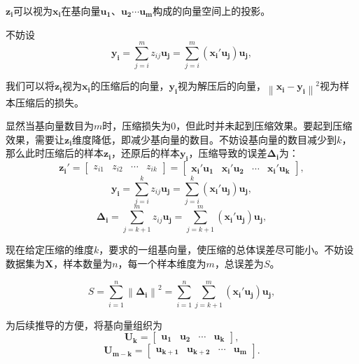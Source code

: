 \documentclass[withoutpreface,bwprint]{cumcmthesis}
\begin{document}
$\boldsymbol{z_{i}}$可以视为$\boldsymbol{x_{i}}$在基向量$\boldsymbol{u_{1}}$、$\boldsymbol{u_{2}}\cdots\boldsymbol{u_{m}}$构成的向量空间上的投影。

不妨设
\begin{equation*}
\boldsymbol{y_{i}}=\sum_{j=i}^{m}z_{ij}\boldsymbol{u_{j}}=\sum_{j=i}^{m}(\boldsymbol{x_{i}'u_{j}})\boldsymbol{u_{j}},
\end{equation*}

我们可以将$\boldsymbol{z_{i}}$视为$\boldsymbol{x_{i}}$的压缩后的向量，$\boldsymbol{y_{i}}$视为解压后的向量，$\left \|\boldsymbol{x_{i}}-\boldsymbol{y_{i}}\right \|^{2}$视为样本压缩后的损失。

显然当基向量数目为$m$时，压缩损失为0，但此时并未起到压缩效果。要起到压缩效果，需要让$\boldsymbol{z_{i}}$维度降低，即减少基向量的数目。不妨设基向量的数目减少到$k$，那么此时压缩后的样本$\boldsymbol{z_{i}}$，还原后的样本$\boldsymbol{y_{i}}$，压缩导致的误差$\boldsymbol{\Delta_{i}}$为：
\begin{equation}
\boldsymbol{z_{i}'}=\begin{bmatrix}z_{i1}&z_{i2}&\cdots&z_{ik}\end{bmatrix}=\begin{bmatrix}\boldsymbol{x_{i}'u_{1}}&\boldsymbol{x_{i}'u_{2}}&\cdots&\boldsymbol{x_{i}'u_{k}}\end{bmatrix},
\end{equation}
\begin{equation}
\boldsymbol{y_{i}}=\sum_{j=i}^{k}z_{ij}\boldsymbol{u_{j}}=\sum_{j=i}^{k}(\boldsymbol{x_{i}'u_{j}})\boldsymbol{u_{j}},
\end{equation}
\begin{equation}
\boldsymbol{\Delta_{i}}=\sum_{j=k+1}^{m}z_{ij}\boldsymbol{u_{j}}=\sum_{j=k+1}^{m}(\boldsymbol{x_{i}'u_{j}})\boldsymbol{u_{j}},
\end{equation}

现在给定压缩的维度$k$，要求的一组基向量，使压缩的总体误差尽可能小。不妨设数据集为$\boldsymbol{X}$，样本数量为$n$，每一个样本维度为$m$，总误差为$S$。

\begin{equation*}
S=\sum_{i=1}^{n}\left \| \boldsymbol{\Delta_{i}} \right \|^{2}=\sum_{i=1}^{n}\sum_{j=k+1}^{m}(\boldsymbol{x_{i}'u_{j}})\boldsymbol{u_{j}},
\end{equation*}

为后续推导的方便，将基向量组织为
\begin{equation*}
\boldsymbol{U_{k}}=\begin{bmatrix}\boldsymbol{u_{1}}&\boldsymbol{u_{2}}&\cdots&\boldsymbol{u_{k}}\end{bmatrix},
\end{equation*}
\begin{equation*}
\boldsymbol{U_{m-k}}=\begin{bmatrix}\boldsymbol{u_{k+1}}&\boldsymbol{u_{k+2}}&\cdots&\boldsymbol{u_{m}}\end{bmatrix}.
\end{equation*}
\end{document}
